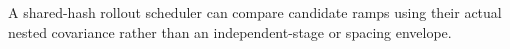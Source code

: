 A shared-hash rollout scheduler can compare candidate ramps using their actual nested covariance rather than an independent-stage or spacing envelope.